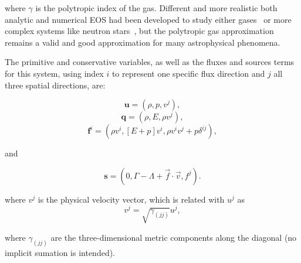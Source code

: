 \noindent where $\gamma$ is the polytropic index of the gas. Different and
more realistic both analytic and numerical EOS had been developed to study
either gases~\citep[cf.][]{ryu2006} or more complex systems like neutron
stars~\citep[cf.][]{zhu2018}, but the polytropic gas approximation remains
a valid and good approximation for many astrophysical phenomena.

The primitive and conservative variables, as well as the fluxes and sources
terms for this system, using index  $i$ to represent one specific flux
direction and $j$ all three spatial directions, are:

\begin{equation}
    \mathbf{u} = \left( \rho, p, v^j \right),
\end{equation}
\begin{equation}
    \mathbf{q} = \left( \rho, E, \rho v^j \right),
\end{equation}
\begin{equation}
    \mathbf{f}^i = \left( \rho v^i, [E + p]v^i, \rho v^i v^j + p\delta^{ij} \right),
\end{equation}

\noindent and

\begin{equation}
    \mathbf{s} = \left( 0, \Gamma - \Lambda + \vec{f}\cdot \vec{v}, f^j \right).
\end{equation}

\noindent where $v^j$ is the physical velocity vector, which is related with $u^j$ as
\begin{equation}
    v^j = \sqrt{\gamma_{(jj)}} u^j,
\end{equation}

\noindent where $\gamma_{(jj)}$ are the three-dimensional metric components along the diagonal (no implicit sumation is intended).
